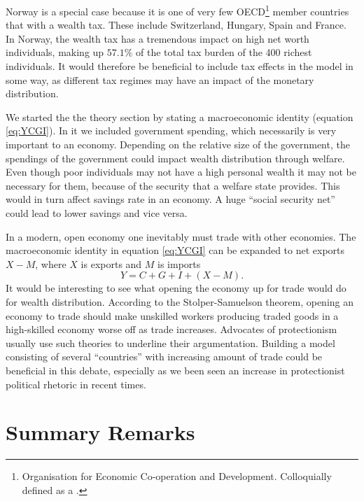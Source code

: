 \documentclass[10pt, a4paper]{amsart}
\begin{document}
Norway is a special case because it is one of very few OECD\footnote{Organisation for Economic Co-operation and Development. Colloquially defined as a .} member countries that with a wealth tax. These include Switzerland, Hungary, Spain and France\cite{OECD}. In Norway, the wealth tax has a tremendous impact on high net worth individuals, making up $57.1\%$ of the total tax burden of the 400 richest individuals\cite{NHHmaster}. It would therefore be beneficial to include tax effects in the model in some way, as different tax regimes may have an impact of the monetary distribution.

We started the the theory section by stating a macroeconomic identity (equation \ref{eq:YCGI}). In it we included government spending, which necessarily is very important to an economy. Depending on the relative size of the government, the spendings of the government could impact wealth distribution through welfare. Even though poor individuals may not have a high personal wealth it may not be necessary for them, because of the security that a welfare state provides. This would in turn affect savings rate in an economy. A huge ``social security net'' could lead to lower savings and vice versa.

In a modern, open economy one inevitably must trade with other economies. The macroeconomic identity in equation \ref{eq:YCGI} can be expanded to net exports $X-M$, where $X$ is exports and $M$ is imports
\begin{equation}
Y = C + G + I + (X-M).
\end{equation}
It would be interesting to see what opening the economy up for trade would do for wealth distribution. According to the Stolper-Samuelson theorem, opening an economy to trade should make unskilled workers producing traded goods in a high-skilled economy worse off as trade increases\cite{StolperSamuelson}. Advocates of protectionism usually use such theories to underline their argumentation. Building a model consisting of several ``countries'' with increasing amount of trade could be beneficial in this debate, especially as we been seen an increase in protectionist political rhetoric in recent times.

\section{Summary Remarks}
\end{document}
